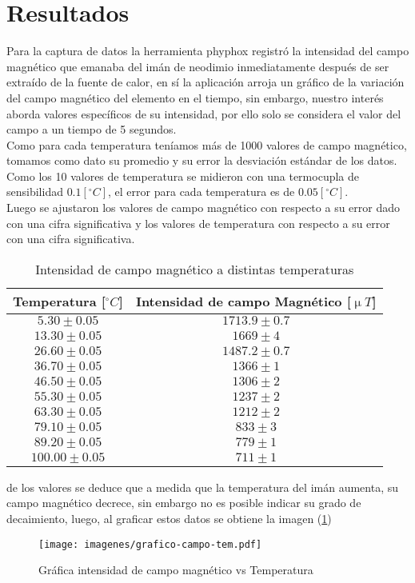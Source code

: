 \section{Resultados}
Para la captura de datos la herramienta phyphox registró la intensidad del campo magnético que emanaba del imán de neodimio inmediatamente después de ser extraído de la fuente de calor, en sí la aplicación arroja un gráfico de la variación del campo magnético del elemento en el tiempo, sin embargo, nuestro interés aborda valores específicos de su intensidad, por ello solo se considera el valor del campo a un tiempo de 5 segundos.\\
Como para cada temperatura teníamos más de 1000 valores de campo magnético, tomamos como dato su promedio y su error la desviación estándar de los datos.\\
Como los 10 valores de temperatura se midieron con una termocupla de sensibilidad $0.1 [^\circ C]$, el error para cada temperatura es de $0.05 [^\circ C]$.\\
Luego se ajustaron los valores de campo magnético con respecto a su error dado con una cifra significativa y los valores de temperatura con respecto a su error con una cifra significativa.\\

\begin{table}[h!]
    \centering
    \begin{tabular}{|c|c|}
        \hline
        Temperatura [$^\circ C$] & Intensidad de campo Magnético [$\upmu T$]\\
        \hline
        $5.30 \pm 0.05$    &  $ 1713.9 \pm 0.7$ \\
        \hline
        $13.30 \pm 0.05$  &   $1669 \pm 4$ \\
        \hline
        $26.60 \pm 0.05$  &   $1487.2 \pm 0.7$\\
        \hline
        $36.70 \pm 0.05 $ &   $1366 \pm 1$\\
        \hline
        $46.50  \pm 0.05$ &   $1306 \pm 2$\\
        \hline
        $55.30 \pm 0.05 $ &   $1237 \pm 2$\\
        \hline
        $63.30  \pm 0.05$ &   $1212 \pm 2$\\
        \hline
        $79.10  \pm 0.05$ &   $833  \pm 3$\\
        \hline
        $89.20  \pm 0.05$ &   $779 \pm 1$\\
        \hline
        $100.00 \pm 0.05$ &   $711  \pm 1 $\\
        \hline

    \end{tabular}
    \caption{Intensidad de campo magnético a distintas temperaturas}
    \label{datos-tabla}
\end{table}
de los valores se deduce que a medida que la temperatura del imán aumenta, su campo magnético decrece, sin embargo no es posible indicar su grado de decaimiento, luego, al graficar estos datos se obtiene la imagen (\ref{Grafica de los datos,sin ajuste}) 

\begin{figure}[h!]
    \centering
    \texttt{[image: imagenes/grafico-campo-tem.pdf]}
    \caption{Gráfica intensidad de campo magnético vs Temperatura}
    \label{Grafica de los datos,sin ajuste}
\end{figure}